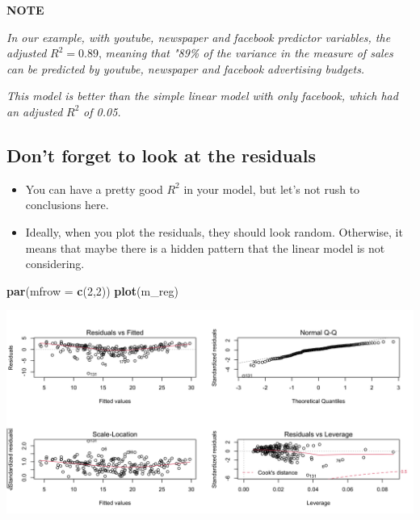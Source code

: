 \documentclass[]{book}
\newenvironment{Shaded}{\begin{snugshade}}{\end{snugshade}}
\newcommand{\DataTypeTok}[1]{\textcolor[rgb]{0.13,0.29,0.53}{#1}}
\newcommand{\DecValTok}[1]{\textcolor[rgb]{0.00,0.00,0.81}{#1}}
\newcommand{\KeywordTok}[1]{\textcolor[rgb]{0.13,0.29,0.53}{\textbf{#1}}}
\newcommand{\NormalTok}[1]{#1}
\begin{document}
\textbf{NOTE}

\emph{In our example, with youtube, newspaper and facebook predictor variables, the adjusted} \(R^2 = 0.89\), \emph{meaning that "89\% of the variance in the measure of sales can be predicted by youtube, newspaper and facebook advertising budgets.}

\emph{This model is better than the simple linear model with only facebook, which had an adjusted} \(R^2\) \emph{of 0.05.}

\hypertarget{dont-forget-to-look-at-the-residuals}{%
\subsection{Don't forget to look at the residuals}\label{dont-forget-to-look-at-the-residuals}}

\begin{itemize}
\item
  You can have a pretty good \(R^2\) in your model, but let's not rush to conclusions here.
\item
  Ideally, when you plot the residuals, they should look random. Otherwise, it means that maybe there is a hidden pattern that the linear model is not considering.
\end{itemize}

\begin{Shaded}
\begin{Highlighting}[]
\KeywordTok{par}\NormalTok{(}\DataTypeTok{mfrow =} \KeywordTok{c}\NormalTok{(}\DecValTok{2}\NormalTok{,}\DecValTok{2}\NormalTok{))}
\KeywordTok{plot}\NormalTok{(m_reg)}
\end{Highlighting}
\end{Shaded}

\begin{center}\includegraphics{figure/unnamed-chunk-31-1} \end{center}
\end{document}
